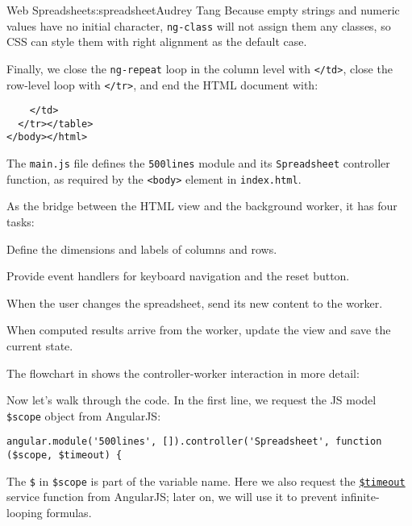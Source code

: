 \begin{aosachapter}{Web Spreadsheet}{s:spreadsheet}{Audrey Tang}
Because empty strings and numeric values have no initial character,
\texttt{ng-class} will not assign them any classes, so CSS can style
them with right alignment as the default case.

Finally, we close the \texttt{ng-repeat} loop in the column level with
\texttt{\textless{}/td\textgreater{}}, close the row-level loop with
\texttt{\textless{}/tr\textgreater{}}, and end the HTML document with:

\begin{verbatim}
    </td>
  </tr></table>
</body></html>
\end{verbatim}

\label{js-main-controller}

The \texttt{main.js} file defines the \texttt{500lines} module and its
\texttt{Spreadsheet} controller function, as required by the
\texttt{\textless{}body\textgreater{}} element in \texttt{index.html}.

As the bridge between the HTML view and the background worker, it has
four tasks:

\begin{aosaitemize}

\item
  Define the dimensions and labels of columns and rows.
\item
  Provide event handlers for keyboard navigation and the reset button.
\item
  When the user changes the spreadsheet, send its new content to the
  worker.
\item
  When computed results arrive from the worker, update the view and save
  the current state.
\end{aosaitemize}

The flowchart in  shows the
controller-worker interaction in more detail:


Now let's walk through the code. In the first line, we request the JS
model \texttt{\$scope} object from AngularJS:

\begin{verbatim}
angular.module('500lines', []).controller('Spreadsheet', function ($scope, $timeout) {
\end{verbatim}

The \texttt{\$} in \texttt{\$scope} is part of the variable name. Here
we also request the
\href{https://docs.angularjs.org/api/ng/service/\$timeout}{\texttt{\$timeout}}
service function from AngularJS; later on, we will use it to prevent
infinite-looping formulas.


\end{aosachapter}

